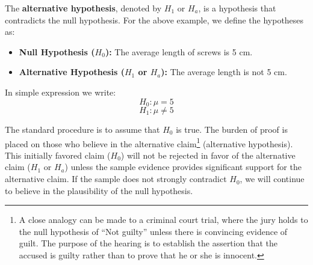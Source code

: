 \documentclass[twoside]{book}
\begin{document}
The \textbf{alternative hypothesis}, denoted by $H_1$ or $H_a$, is a hypothesis that contradicts the null hypothesis. For the above example, we define the hypotheses as:

\begin{itemize}
    \item \textbf{Null Hypothesis ($H_0$):} The average length of screws is 5 cm.
    \item \textbf{Alternative Hypothesis ($H_1$ or $H_a$):} The average length is not 5 cm.
\end{itemize}

In simple expression we write:
    $$H_0: \mu = 5$$
    $$H_1 : \mu \neq 5$$


The standard procedure is to assume that $H_0$ is true. The burden of proof is placed on those who believe in the alternative claim\footnote{A close analogy can be made to a criminal court trial, where the jury holds to the null hypothesis of ``Not guilty'' unless there is convincing evidence of guilt.  The purpose of the hearing is to establish the assertion that the accused is guilty rather than to prove that he or she is innocent.} (alternative hypothesis). This initially favored claim ($H_0$) will not be rejected in favor of the alternative claim ($H_1$ or $H_a$) unless the sample evidence provides significant support for the alternative claim. If the sample does not strongly contradict $H_0$, we will continue to believe in the plausibility of the null hypothesis.

\vspace{3mm}
\begin{center}
\end{center}
\end{document}
